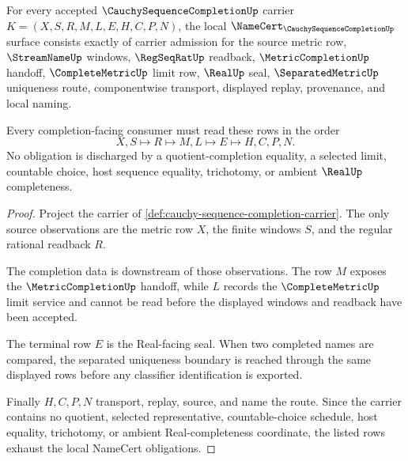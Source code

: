 \begin{theorem}
\label{thm:cauchy-sequence-completion-namecert-obligations}
For every accepted $\CauchySequenceCompletionUp$ carrier $K=(X,S,R,M,L,E,H,C,P,N)$, the local $\NameCert_{\CauchySequenceCompletionUp}$ surface consists exactly of carrier admission for the source metric row, $\StreamNameUp$ windows, $\RegSeqRatUp$ readback, $\MetricCompletionUp$ handoff, $\CompleteMetricUp$ limit row, $\RealUp$ seal, $\SeparatedMetricUp$ uniqueness route, componentwise transport, displayed replay, provenance, and local naming.

Every completion-facing consumer must read these rows in the order
$$
X,S \longmapsto R \longmapsto M,L \longmapsto E \longmapsto H,C,P,N .
$$
No obligation is discharged by a quotient-completion equality, a selected limit, countable choice, host sequence equality, trichotomy, or ambient $\RealUp$ completeness.
\end{theorem}
\begin{proof}
Project the carrier of \autoref{def:cauchy-sequence-completion-carrier}. The only source observations are the metric row $X$, the finite windows $S$, and the regular rational readback $R$.

The completion data is downstream of those observations. The row $M$ exposes the $\MetricCompletionUp$ handoff, while $L$ records the $\CompleteMetricUp$ limit service and cannot be read before the displayed windows and readback have been accepted.

The terminal row $E$ is the Real-facing seal. When two completed names are compared, the separated uniqueness boundary is reached through the same displayed rows before any classifier identification is exported.

Finally $H,C,P,N$ transport, replay, source, and name the route. Since the carrier contains no quotient, selected representative, countable-choice schedule, host equality, trichotomy, or ambient Real-completeness coordinate, the listed rows exhaust the local NameCert obligations.
\end{proof}


